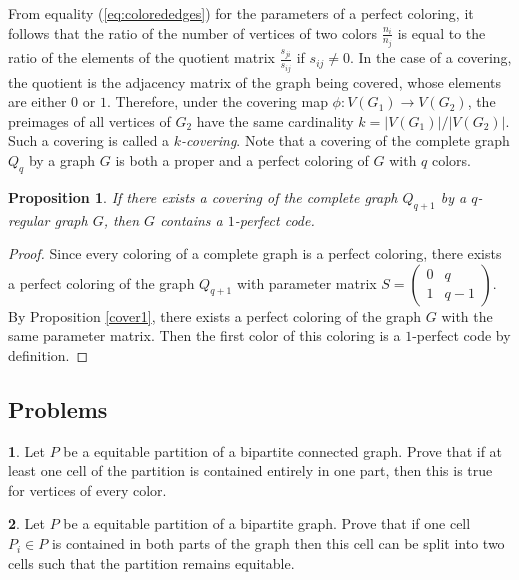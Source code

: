 \documentclass[11pt]{article}
\newtheorem{claim}{Proposition}[section]
\theoremstyle{definition}
\newtheorem{exercise}{\quad}
\begin{document}
From equality (\ref{eq:colorededges}) for the parameters of a perfect
coloring, it follows that the ratio of the number of vertices of  two colors
$\frac{n_i}{n_j}$ is equal to the ratio of the elements of the quotient matrix
$\frac{s_{ji}}{s_{ij}}$ if $s_{ij}\neq 0$. In the case of a covering,
the quotient  is the adjacency matrix
of the graph being covered, whose elements are either $0$ or $1$.
Therefore, under the covering map $\phi: V(G_1)\rightarrow V(G_2)$, the preimages of all vertices of $G_2$ have the same cardinality
$k=|V(G_1)|/|V(G_2)|$. Such a covering is called a {\sl $k$-covering}.
Note that a covering of the complete graph $Q_q$ by  a graph $G$ is both a proper and a perfect coloring of $G$ with $q$
colors.

\begin{claim}
If there exists a covering of the complete graph
$Q_{q+1}$ by a $q$-regular graph $G$, then $G$ contains a $1$-perfect code.
\end{claim}
\begin{proof}
Since every coloring of a complete graph is a perfect coloring,
there exists a perfect coloring of the graph $Q_{q+1}$ with parameter matrix
$S=\begin{pmatrix}
0 & q \\
1 & q-1
\end{pmatrix}$. By Proposition \ref{cover1}, there exists a perfect
coloring of the graph $G$ with the same parameter matrix. Then the first color
of this coloring is a $1$-perfect code by definition.
\end{proof}







\subsection{Problems}



\begin{exercise}
Let $P$ be a equitable partition of a bipartite connected
graph.
Prove that if  at least one cell of the partition is contained entirely in one part,
then this is true for vertices of every color. 
\end{exercise}

\begin{exercise}
Let $P$ be a equitable partition of a bipartite 
graph. Prove that  if  one cell $P_i\in P$  is contained  in both parts of the graph then this cell can be split into two cells such that the partition
remains equitable. 
 \end{exercise}
\end{document}
